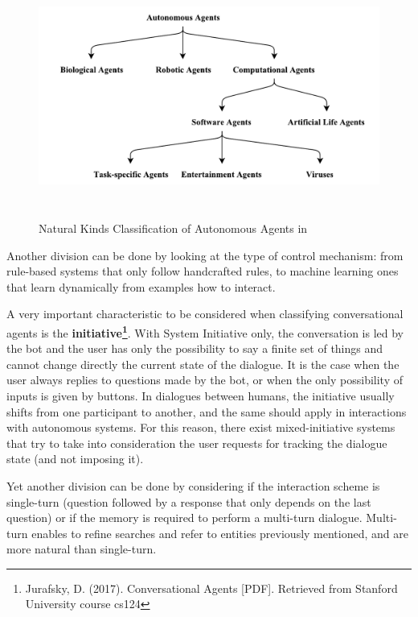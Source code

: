 \begin{figure}[!htbp]
    \centering
    \includegraphics[max width=\linewidth,max height=8cm,keepaspectratio]{figures/franklinClassification}
    \caption{Natural Kinds Classification of Autonomous Agents in~\cite{franklin1996agent}}\label{fig:franklinClassification}
\end{figure}

Another division can be done by looking at the type of control mechanism: from rule-based systems that only follow handcrafted rules, to machine learning ones that learn dynamically from examples how to interact.

A very important characteristic to be considered when classifying conversational agents is the \textbf{initiative\footnote{ Jurafsky, D. (2017). Conversational Agents [PDF]. Retrieved from Stanford University course cs124 }}. With System Initiative only, the conversation is led by the bot and the user has only the possibility to say a finite set of things and cannot change directly the current state of the dialogue. It is the case when the user always replies to questions made by the bot, or when the only possibility of inputs is given by buttons. In dialogues between humans, the initiative usually shifts from one participant to another, and the same should apply in interactions with autonomous systems. For this reason, there exist mixed-initiative systems that try to take into consideration the user requests for tracking the dialogue state (and not imposing it).

Yet another division can be done by considering if the interaction scheme is single-turn (question followed by a response that only depends on the last question) or if the memory is required to perform a multi-turn dialogue. Multi-turn enables to refine searches and refer to entities previously mentioned, and are more natural than single-turn.


